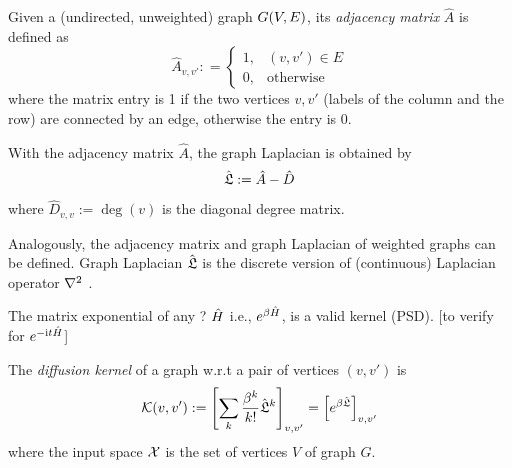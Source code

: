 \begin{definition}\label{def:adjacency_matrix}
	Given a (undirected, unweighted) graph $G(V,E)$, its \emph{adjacency matrix} $\hat{A}$ is defined as
	\begin{equation}
		\hat{A}_{v,v'} : = 
		\begin{cases}
			1, & (v,v') \in E \\
			0, & \text{otherwise}
		\end{cases}
	\end{equation}
	where the matrix entry is 1 if the two vertices $v,v'$ (labels of the column and the row) are connected by an edge, otherwise the entry is 0.
\end{definition}
\begin{definition}\label{def:graph_laplacian}
	With the adjacency matrix $\hat{A}$, the graph Laplacian is obtained by
	\begin{equation}
		\hat{\mathfrak{L}}:=\hat{A}-\hat{D}	
	\end{equation}
	where $\hat{D}_{v,v}:=\deg(v)$ is the diagonal degree matrix.
\end{definition}
	Analogously, the adjacency matrix and graph Laplacian of weighted graphs can be defined.
	Graph Laplacian $\hat{\mathfrak{L}}$ is the 
	discrete version of (continuous) Laplacian operator $\laplacian$
	\cite{chungSpectralGraphTheory1997}.
\begin{observation}
	The matrix exponential of any ? $\hat{H}$ i.e., $e^{\beta \hat{H}}$, is a valid kernel (PSD). [to verify for $e^{-\textup{i} t\hat{H}}$]
\end{observation}
\begin{definition}\label{def:diffusion_kernel}
	The \emph{diffusion kernel} of a graph w.r.t a pair of vertices $(v,v')$ is
	\begin{equation}
		\mathcal{K}(v,v') := 
		\qty[\sum_{k}\frac{\beta^k}{k!}\hat{\mathfrak{L}}^k]_{v,v'}  =
		\qty[e^{\beta \hat{\mathfrak{L}}}]_{v,v'} 
	\end{equation}
	where the input space $\mathcal{X}$ is the set of vertices $V$ of graph $G$.
\end{definition}

